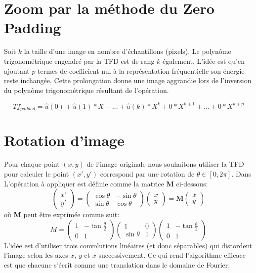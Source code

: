 \documentclass[12pt]{article}
\begin{document}
\section*{Zoom par la méthode du Zero Padding}

Soit $k$ la taille d'une image en nombre d'échantillons (pixels). 
Le polynôme trigonométrique engendré par la TFD est de rang $k$ également. 
L'idée est qu'en ajoutant $p$ termes de coefficient nul à la représentation fréquentielle son énergie reste inchangée. 
Cette prolongation donne une image aggrandie lors de l'inversion du polynôme trigonométrique résultant de l'opération.

\begin{equation}
    Tf_{padded} = \hat{u}(0) + \hat{u}(1) * X + ... + \hat{u}(k) * X^k + 0*X^{k+1} + ... + 0*X^{k+p}
\end{equation}


\section*{Rotation d'image}
Pour chaque point $(x, y)$ de l'image originale nous souhaitons utiliser la TFD pour calculer le point $(x', y')$ correspond par une rotation de $\theta \in {[0, 2\pi]}$. \newline
Dans \cite{unser95} \cite{larkin97} L'opération à appliquer est définie comme la matrice \textbf{M} ci-dessous:
$$\begin{pmatrix}
x' \\ y'
\end{pmatrix}=
\begin{pmatrix}
\cos \theta & -\sin \theta \\
\sin \theta & \cos \theta
\end{pmatrix}
\begin{pmatrix}
x \\ y
\end{pmatrix}=\textbf{M}
\begin{pmatrix}
x \\ y
\end{pmatrix}
$$
où \textbf{M} peut être exprimée comme suit:
$$M =
\begin{pmatrix}
1 & -\tan \frac{\theta}{2} \\
0 & 1
\end{pmatrix}
\begin{pmatrix}
1 & 0 \\
\sin \theta & 1
\end{pmatrix}
\begin{pmatrix}
1 & -\tan \frac{\theta }{2}\\
0 & 1
\end{pmatrix}
$$
L'idée est d'utiliser trois convolutions linéaires (et donc séparables) qui distordent l'image selon les axes $x$, $y$ et $x$ successivement.
Ce qui rend l'algorithme efficace est que chacune s'écrit comme une translation dans le domaine de Fourier.
\end{document}
